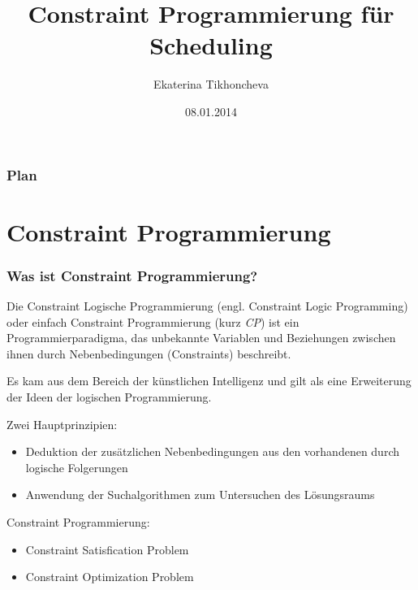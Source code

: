 \documentclass[hyperref={pdfpagelabels=false}]{beamer}
\title{Constraint Programmierung für Scheduling}
\author{Ekaterina Tikhoncheva}
\date{08.01.2014}
\newcommand{\inhalt}{\frame{   \frametitle{Überblick}   \tableofcontents[currentsection]}}
\begin{document}
\begin{frame}
\titlepage
\end{frame}
\begin{frame}
\frametitle{Plan}
\tableofcontents
\end{frame} 


\section{Constraint Programmierung}
\inhalt

\nocite{CSP}
\nocite{CPforScheduling}
\begin{frame}

\frametitle{Was ist Constraint Programmierung?}

\begin{definition}
    Die {\color{darkred} Constraint Logische Programmierung} (engl. Constraint Logic Programming) oder einfach {\color{darkred}Constraint Programmierung} (kurz {\color{darkred} \it CP}) ist ein Programmierparadigma, das unbekannte Variablen und Beziehungen zwischen ihnen durch Nebenbedingungen (Constraints) beschreibt. 
\end{definition}
\pause

{\centering
Es kam aus dem Bereich der künstlichen Intelligenz und gilt als eine Erweiterung
der Ideen der logischen Programmierung.
}

\pause
{\color{darkred}Zwei Hauptprinzipien}:
\begin{itemize}
\item Deduktion der zusätzlichen Nebenbedingungen aus den vorhandenen durch logische Folgerungen
\item Anwendung der Suchalgorithmen zum Untersuchen des Lösungsraums
\end{itemize}
\end{frame}
\begin{frame}

Constraint Programmierung:
\begin{itemize}
\centering
\item Constraint Satisfication Problem
\item Constraint Optimization Problem
\end{itemize}

\end{frame}
\end{document}

